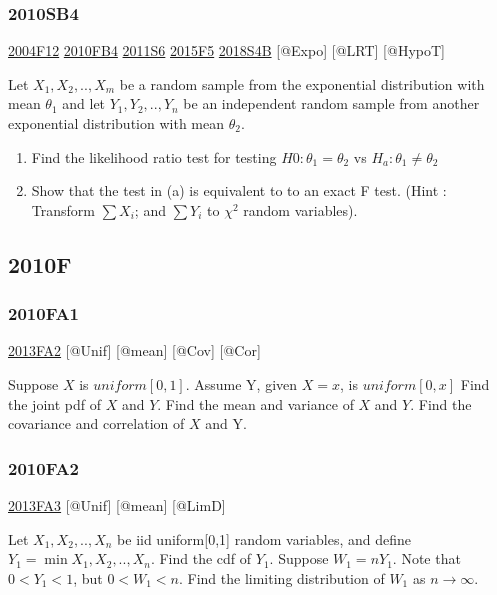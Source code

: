 \documentclass[6pt,Portrait]{article}
\begin{document}
\hypertarget{sb4}{%
\subsubsection{2010SB4}\label{sb4}}

\protect\hyperlink{f12}{2004F12} \protect\hyperlink{fb4-1}{2010FB4}
\protect\hyperlink{s6-2}{2011S6} \protect\hyperlink{f5-5}{2015F5}
\protect\hyperlink{s4b-2}{2018S4B} {[}@Expo{]} {[}@LRT{]} {[}@HypoT{]}

Let \(X_1,X_2,..,X_{m}\) be a random sample from the exponential
distribution with mean \(\theta_1\) and let \(Y_1,Y_2,..,Y_{n}\) be an
independent random sample from another exponential distribution with
mean \(\theta_2\).

\begin{enumerate}
\def\labelenumi{(\alph{enumi})}
\item
  Find the likelihood ratio test for testing \(H0:\theta_1=\theta_2\) vs
  \(H_a:\theta_1\neq\theta_2\)
\item
  Show that the test in (a) is equivalent to to an exact F test. (Hint :
  Transform \(\sum X_i\); and \(\sum Y_i\) to \(\chi^2\) random
  variables).
\end{enumerate}

\hypertarget{f-6}{%
\subsection{2010F}\label{f-6}}

\hypertarget{fa1-1}{%
\subsubsection{2010FA1}\label{fa1-1}}

\protect\hyperlink{fa2-2}{2013FA2} {[}@Unif{]} {[}@mean{]} {[}@Cov{]}
{[}@Cor{]}

Suppose \(X\) is \(uniform[0,1]\). Assume Y, given \(X=x\), is
\(uniform[0,x]\) Find the joint pdf of \(X\) and \(Y\). Find the mean
and variance of \(X\) and \(Y\). Find the covariance and correlation of
\(X\) and Y.

\hypertarget{fa2-1}{%
\subsubsection{2010FA2}\label{fa2-1}}

\protect\hyperlink{fa3-2}{2013FA3} {[}@Unif{]} {[}@mean{]} {[}@LimD{]}

Let \(X_1,X_2,..,X_{n}\) be iid uniform{[}0,1{]} random variables, and
define \(Y_1=\min{X_1,X_2,..,X_{n}}\). Find the cdf of \(Y_1\). Suppose
\(W_1=nY_1\). Note that \(0<Y_1<1\), but \(0<W_1<n\). Find the limiting
distribution of \(W_1\) as \(n\to\infty\).
\end{document}
